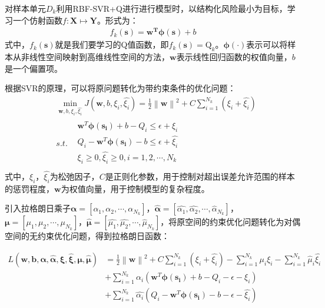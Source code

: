 对样本单元$D_{k}$利用RBF-SVR+Q进行进行模型时，以结构化风险最小为目标，学习一个仿射函数$f:\mathbf{X} \mapsto \mathbf{Y}$。形式为：
\begin{equation}
\begin{aligned}
f_{k}(\mathbf{s})=\mathbf{w^{T}} \bm{\phi(s)} + b
\end{aligned}
\end{equation}
式中，$f_{k}(\mathbf{s})$就是我们要学习的Q值函数，即$f_{k}(\mathbf{s}) = \text{Q}_{k}$。$\bm{\phi(\cdot)}$表示可以将样本从非线性空间映射到高维线性空间的方法，$\mathbf{w}$表示线性回归函数的权值向量，$b$是一个偏置项。

根据SVR的原理，可以将原问题转化为带约束条件的优化问题：
\begin{equation}\label{seq_svr_ori}
\begin{split}
& \min_{\mathbf{w},b,\xi_{i},\hat{\xi_{i}}}  J(\mathbf{w},b,\xi_{i},\hat{\xi_{i}}) = \frac{1}{2} \left \| \mathbf{w} \right \|^{2} + C \sum_{i=1}^{N_{k}}(\xi_{i}+\hat{\xi_{i}})\\ 
& s.t. \begin{matrix}
&\mathbf{w}^{T} \bm{\phi(s_{i})} + b - Q_{i} \leqslant \epsilon + \xi_{i}\\
&Q_{i} - \mathbf{w}^{T} \bm{\phi(s_{i})} - b  \leqslant \epsilon + \hat{\xi_{i}} \\
&\xi_{i} \geqslant 0,\hat{\xi_{i}} \geqslant 0, i=1,2,\cdots,N_{k}\\
\end{matrix}
\end{split}
\end{equation}
式中，$\xi_{i}$，$\hat{\xi_{i}}$为松弛因子，$C$是正则化参数，用于控制对超出误差允许范围的样本的惩罚程度，$\mathbf{w}$为权值向量，用于控制模型的复杂程度。

引入拉格朗日乘子$\bm{\alpha}=[\alpha_{1},\alpha_{2},\cdots,\alpha_{N_{k}}]$，$\bm{\hat{\alpha}}=[\hat{\alpha_{1}},\hat{\alpha_{2}},\cdots,\hat{\alpha}_{N_{k}}]$，$\bm{\mu}=[\mu_{1},\mu_{2},\cdots,\mu_{N_{k}}]$，$\bm{\hat{\mu}}=[\hat{\mu_{1}},\hat{\mu_{2}},\cdots,\hat{\mu}_{N_{k}}]$，将原空间的约束优化问题转化为对偶空间的无约束优化问题，得到拉格朗日函数：

\begin{equation}\label{seq_lagrange}
\begin{aligned}
L(\mathbf{w}, \mathbf{b}, \bm{\alpha}, \bm{\hat{\alpha}}, \bm{\xi}, \bm{\hat{\xi}},
\bm{\mu},\bm{\hat{\mu}})&=\frac{1}{2} \left \| \mathbf{{w}} \right \|^{2} + C \sum_{i=1}^{N_{k}}(\xi_{i} + \hat{\xi_{i}}) - \sum_{i=1}^{N_{k}}\mu_{i}\xi_{i} - \sum_{i=1}^{N_{k}}\hat{\mu}_{i}\hat{\xi_{i}} \\ 
&+ \sum_{i=1}^{N_{k}} \alpha_{i}(\mathbf{w}^{T} \bm{\phi(s_{i})} + b - Q_{i} - \epsilon - \xi_{i}) \\
&+ \sum_{i=1}^{N_{k}} \hat{\alpha_{i}}(Q_{i} - \mathbf{w}^{T} \bm{\phi(s_{i})} - b - \epsilon - \hat{\xi_{i}})\\
\end{aligned}
\end{equation}

